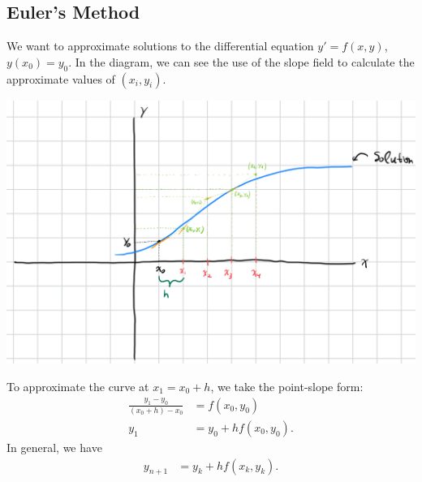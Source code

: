 \documentclass[10pt]{mypackage}
\begin{document}
\subsection{Euler's Method}%
We want to approximate solutions to the differential equation $y' = f(x,y)$, $y(x_0) = y_0$. In the diagram, we can see the use of the slope field to calculate the approximate values of $\left(x_i,y_i\right)$.
\begin{center}
  \includegraphics[width=15cm]{images/eulers_method_1.png}
\end{center}
\begin{method}
  To approximate the curve at $x_1 = x_0 + h$, we take the point-slope form:
  \begin{align*}
    \frac{y_1 - y_0}{\left(x_0 + h\right)-x_0} &= f\left(x_0,y_0\right)\\
    y_1 &= y_0 + hf\left(x_0,y_0\right).
  \end{align*}
  In general, we have
  \begin{align*}
    y_{n+1} &= y_k + hf\left(x_k,y_k\right).
  \end{align*}
\end{method}
\end{document}
